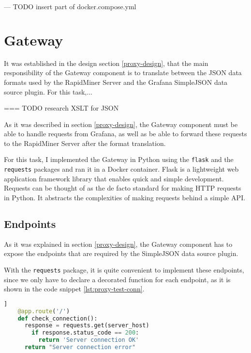 \begin{center}
	--- TODO insert part of docker.compose.yml
\end{center}

\section{Gateway}

It was established in the design section \ref{proxy-design}, that the main responsibility of the Gateway component is to translate between the JSON data formats used by the RapidMiner Server and the Grafana SimpleJSON data source plugin. For this task,... 

\begin{center}
	=== TODO research XSLT for JSON
\end{center}

As it was described in section \ref{proxy-design}, the Gateway component must be able to handle requests from Grafana, as well as be able to forward these requests to the RapidMiner Server after the format translation. 

For this task, I implemented the Gateway in Python using the \texttt{flask} and the \texttt{requests} packages and ran it in a Docker container. Flask is a lightweight web application framework library that enables quick and simple development. Requests can be thought of as the de facto standard for making HTTP requests in Python. It abstracts the complexities of making requests behind a simple API.

\subsection{Endpoints}

As it was explained in section \ref{proxy-design}, the Gateway component has to expose the endpoints that are required by the SimpleJSON data source plugin.

With the \texttt{requests} package, it is quite convenient to implement these endpoints, since we only have to declare a decorated function for each endpoint, as it is shown in the code snippet \ref{lst:proxy-test-conn}.

\begin{lstlisting}[language=Python, caption={Test the connection to the server}, label={lst:proxy-test-conn}]]
	@app.route('/')
	def check_connection():
	  response = requests.get(server_host)
	    if response.status_code == 200:
	      return 'Server connection OK'
	  return "Server connection error"
\end{lstlisting}

